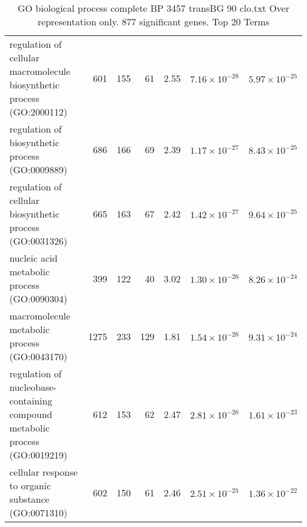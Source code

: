 \begin{table}[ht]
\begin{adjustbox}{width=\textwidth}
\begin{tabular}{lrrrlrr}
  regulation of cellular macromolecule biosynthetic process (GO:2000112) & 601 & 155 & 61 & 2.55 & $7.16 \times 10^{-28}$ & $5.97 \times 10^{-25}$ \\ 
  regulation of biosynthetic process (GO:0009889) & 686 & 166 & 69 & 2.39 & $1.17 \times 10^{-27}$ & $8.43 \times 10^{-25}$ \\ 
  regulation of cellular biosynthetic process (GO:0031326) & 665 & 163 & 67 & 2.42 & $1.42 \times 10^{-27}$ & $9.64 \times 10^{-25}$ \\ 
  nucleic acid metabolic process (GO:0090304) & 399 & 122 & 40 & 3.02 & $1.30 \times 10^{-26}$ & $8.26 \times 10^{-24}$ \\ 
  macromolecule metabolic process (GO:0043170) & 1275 & 233 & 129 & 1.81 & $1.54 \times 10^{-26}$ & $9.31 \times 10^{-24}$ \\ 
  regulation of nucleobase-containing compound metabolic process (GO:0019219) & 612 & 153 & 62 & 2.47 & $2.81 \times 10^{-26}$ & $1.61 \times 10^{-23}$ \\ 
  cellular response to organic substance (GO:0071310) & 602 & 150 & 61 & 2.46 & $2.51 \times 10^{-25}$ & $1.36 \times 10^{-22}$ \\ 
   \hline
\end{tabular}
\end{adjustbox}
\caption{GO biological process complete BP 3457 transBG 90 clo.txt Over representation only. 877 significant genes. Top 20 Terms} 
\label{tab:GO biological process complete BP 3457 transBG 90 clo.txt Over representation only. 877 significant genes. Top 20 Terms}
\end{table}




